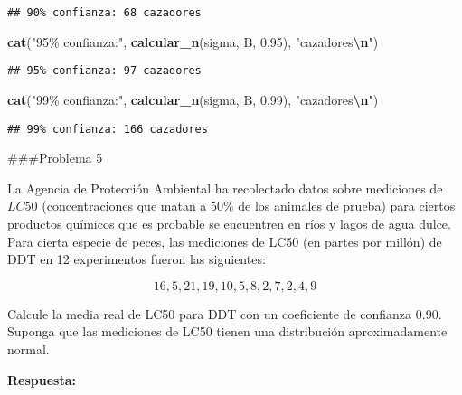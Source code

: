 \documentclass[
]{article}
\newenvironment{Shaded}{\begin{snugshade}}{\end{snugshade}}
\newcommand{\FloatTok}[1]{\textcolor[rgb]{0.00,0.00,0.81}{#1}}
\newcommand{\FunctionTok}[1]{\textcolor[rgb]{0.13,0.29,0.53}{\textbf{#1}}}
\newcommand{\NormalTok}[1]{#1}
\newcommand{\SpecialCharTok}[1]{\textcolor[rgb]{0.81,0.36,0.00}{\textbf{#1}}}
\newcommand{\StringTok}[1]{\textcolor[rgb]{0.31,0.60,0.02}{#1}}
\begin{document}
\begin{verbatim}
## 90% confianza: 68 cazadores
\end{verbatim}

\begin{Shaded}
\begin{Highlighting}[]
\FunctionTok{cat}\NormalTok{(}\StringTok{"95\% confianza:"}\NormalTok{, }\FunctionTok{calcular\_n}\NormalTok{(sigma, B, }\FloatTok{0.95}\NormalTok{), }\StringTok{"cazadores}\SpecialCharTok{\textbackslash{}n}\StringTok{"}\NormalTok{)}
\end{Highlighting}
\end{Shaded}

\begin{verbatim}
## 95% confianza: 97 cazadores
\end{verbatim}

\begin{Shaded}
\begin{Highlighting}[]
\FunctionTok{cat}\NormalTok{(}\StringTok{"99\% confianza:"}\NormalTok{, }\FunctionTok{calcular\_n}\NormalTok{(sigma, B, }\FloatTok{0.99}\NormalTok{), }\StringTok{"cazadores}\SpecialCharTok{\textbackslash{}n}\StringTok{"}\NormalTok{)}
\end{Highlighting}
\end{Shaded}

\begin{verbatim}
## 99% confianza: 166 cazadores
\end{verbatim}

\#\#\#Problema 5

La Agencia de Protección Ambiental ha recolectado datos sobre mediciones
de \(LC50\) (concentraciones que matan a \(50 \%\) de los animales de
prueba) para ciertos productos químicos que es probable se encuentren en
ríos y lagos de agua dulce. Para cierta especie de peces, las mediciones
de LC50 (en partes por millón) de DDT en 12 experimentos fueron las
siguientes:

\[16, 5, 21, 19, 10, 5, 8, 2, 7, 2, 4, 9\]

Calcule la media real de LC50 para DDT con un coeficiente de confianza
\(0.90\). Suponga que las mediciones de LC50 tienen una distribución
aproximadamente normal.

\textbf{Respuesta:}
\end{document}
